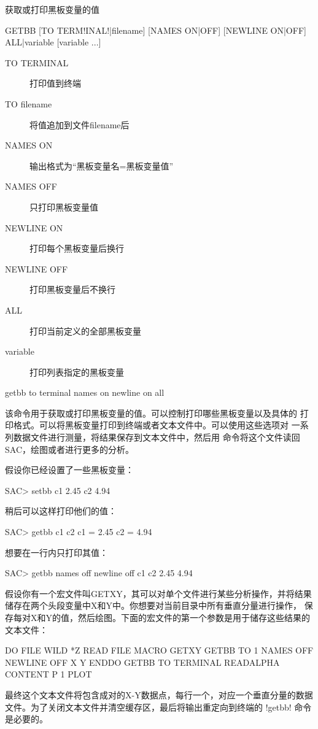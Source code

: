 \label{cmd:getbb}

获取或打印黑板变量的值

\begin{SACSTX}
GETBB [TO TERM!INAL!|filename] [NAMES ON|OFF] [NEWLINE ON|OFF]
    ALL|variable [variable ...]
\end{SACSTX}

\begin{description}
\item [TO TERMINAL] 打印值到终端
\item [TO filename] 将值追加到文件filename后
\item [NAMES ON] 输出格式为``黑板变量名=黑板变量值''
\item [NAMES OFF] 只打印黑板变量值
\item [NEWLINE ON] 打印每个黑板变量后换行
\item [NEWLINE OFF] 打印黑板变量后不换行
\item [ALL] 打印当前定义的全部黑板变量
\item [variable] 打印列表指定的黑板变量
\end{description}

\begin{SACDFT}
getbb to terminal names on newline on all
\end{SACDFT}

该命令用于获取或打印黑板变量的值。可以控制打印哪些黑板变量以及具体的
打印格式。可以将黑板变量打印到终端或者文本文件中。可以使用这些选项对
一系列数据文件进行测量，将结果保存到文本文件中，然后用 
命令将这个文件读回SAC，绘图或者进行更多的分析。

假设你已经设置了一些黑板变量：
\begin{SACCode}
SAC> setbb c1 2.45 c2 4.94
\end{SACCode}

稍后可以这样打印他们的值：
\begin{SACCode}
SAC> getbb c1 c2
 c1 = 2.45
 c2 = 4.94
\end{SACCode}

想要在一行内只打印其值：
\begin{SACCode}
SAC> getbb names off newline off c1 c2
 2.45 4.94
\end{SACCode}

假设你有一个宏文件叫GETXY，其可以对单个文件进行某些分析操作，并将结果
储存在两个头段变量中X和Y中。你想要对当前目录中所有垂直分量进行操作，
保存每对X和Y的值，然后绘图。下面的宏文件的第一个参数是用于储存这些结果的
文本文件：
\begin{SACCode}
DO FILE WILD *Z
  READ FILE
  MACRO GETXY
  GETBB TO 1 NAMES OFF NEWLINE OFF X Y
ENDDO
GETBB TO TERMINAL
READALPHA CONTENT P 1
PLOT
\end{SACCode}
最终这个文本文件将包含成对的X-Y数据点，每行一个，对应一个垂直分量的数据
文件。为了关闭文本文件并清空缓存区，最后将输出重定向到终端的 !getbb!
命令是必要的。
